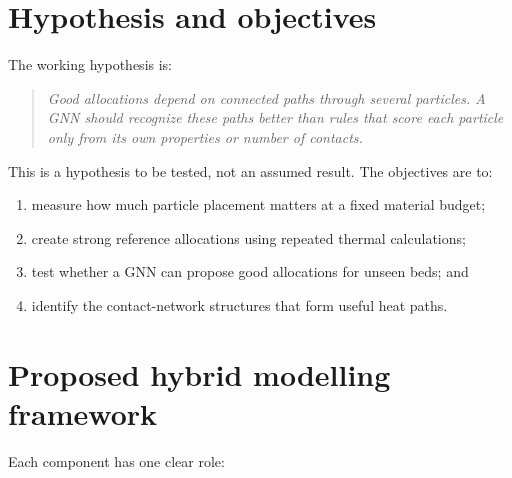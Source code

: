\documentclass[10pt,a4paper]{article}
\begin{document}
\newpage
\section{Hypothesis and objectives}
The working hypothesis is:
\begin{quote}\itshape
Good allocations depend on connected paths through several particles. A GNN
should recognize these paths better than rules that score each particle only
from its own properties or number of contacts.
\end{quote}
This is a hypothesis to be tested, not an assumed result. The objectives are to:
\begin{enumerate}
\item measure how much particle placement matters at a fixed material budget;
\item create strong reference allocations using repeated thermal calculations;
\item test whether a GNN can propose good allocations for unseen beds; and
\item identify the contact-network structures that form useful heat paths.
\end{enumerate}

\section{\hspace{0.25em}Proposed hybrid modelling framework}
Each component has one clear role:
\begin{center}
\end{center}
\end{document}
